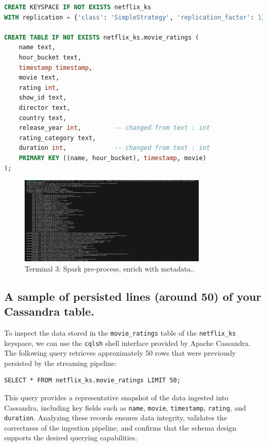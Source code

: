 \documentclass[a4paper,11pt]{article}
\theoremstyle{mytheor}
\begin{document}
\begin{lstlisting}[language=SQL,caption={Cassandra schema for movie ratings},label={lst:cassandra-schema}]
CREATE KEYSPACE IF NOT EXISTS netflix_ks
WITH replication = {'class': 'SimpleStrategy', 'replication_factor': 1};

CREATE TABLE IF NOT EXISTS netflix_ks.movie_ratings (
    name text,
    hour_bucket text,
    timestamp timestamp,
    movie text,
    rating int,
    show_id text,
    director text,
    country text,
    release_year int,         -- changed from text : int
    rating_category text,
    duration int,             -- changed from text : int
    PRIMARY KEY ((name, hour_bucket), timestamp, movie)
);
\end{lstlisting}

\begin{figure}[h!]
    \centering
    \includegraphics[width=0.8\textwidth]{4-spark-preprocess.png} %
    \caption{Terminal 3: Spark pre-process, enrich with metadata..}
    \label{fig:cassandra-sample}
\end{figure}

\subsection*{A sample of persisted lines (around 50) of your Cassandra table.}

To inspect the data stored in the \texttt{movie\_ratings} table of the \texttt{netflix\_ks} keyspace, we can use the \texttt{cqlsh} shell interface provided by Apache Cassandra. The following query retrieves approximately 50 rows that were previously persisted by the streaming pipeline:

\begin{verbatim}
SELECT * FROM netflix_ks.movie_ratings LIMIT 50;
\end{verbatim}

This query provides a representative snapshot of the data ingested into Cassandra, including key fields such as \texttt{name}, \texttt{movie}, \texttt{timestamp}, \texttt{rating}, and \texttt{duration}. Analyzing these records ensures data integrity, validates the correctness of the ingestion pipeline, and confirms that the schema design supports the desired querying capabilities.
\end{document}
